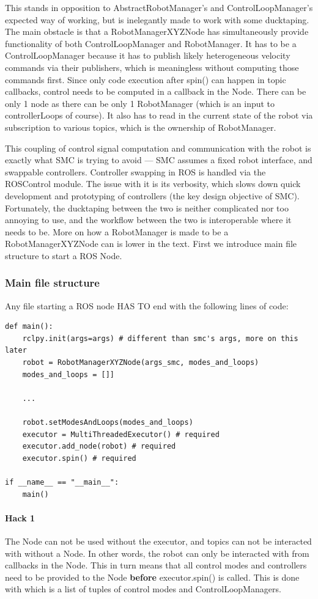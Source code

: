 This stands in opposition to AbstractRobotManager's and ControlLoopManager's expected way of working,
but is inelegantly made to work with some ducktaping. 
The main obstacle is that a RobotManagerXYZNode has simultaneously provide functionality of both
ControlLoopManager and RobotManager.
It has to be a ControlLoopManager because it has to publish likely heterogeneous velocity commands via their publishers,
which is meaningless without computing those commands first.
Since only code execution after spin() can happen in topic callbacks,
control needs to be computed in a callback in the Node. There can be only 1 node
as there can be only 1 RobotManager (which is an input to controllerLoops of course).
It also has to read in the current state of the robot via subscription to various topics,
which is the ownership of RobotManager.

This coupling of control signal computation and communication with the robot is exactly
what SMC is trying to avoid --- SMC assumes a fixed robot interface, and swappable controllers.
Controller swapping in ROS is handled via the ROSControl module. The issue with it is its 
verbosity, which slows down quick development and prototyping of controllers (the key
design objective of SMC).
Fortunately, the ducktaping between the two is neither complicated nor too annoying to use,
and the workflow between the two is interoperable where it needs to be.
More on how a RobotManager is made to be a RobotManagerXYZNode can is 
lower in the text. First we introduce main file structure to start a ROS Node.

\subsubsection{Main file structure}
Any file starting a ROS node HAS TO end with the following lines of code:
\begin{verbatim}
def main():
    rclpy.init(args=args) # different than smc's args, more on this later
    robot = RobotManagerXYZNode(args_smc, modes_and_loops)
	modes_and_loops = []]

	...

	robot.setModesAndLoops(modes_and_loops)
    executor = MultiThreadedExecutor() # required
    executor.add_node(robot) # required
    executor.spin() # required

if __name__ == "__main__":
    main()
\end{verbatim}
\paragraph{Hack 1}
The Node can not be used without the executor, and topics can not be interacted with without a Node.
In other words, the robot can only be interacted with from callbacks in the Node.
This in turn means that all control modes and controllers need to be provided to the Node \textbf{before}
executor.spin() is called.
This is done with  which is a list of tuples
of control modes and ControlLoopManagers. 

